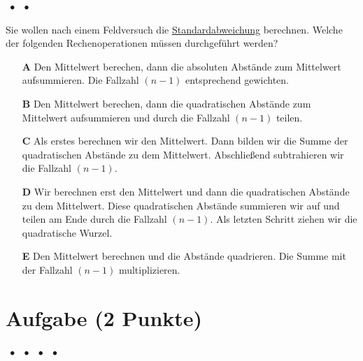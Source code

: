 \documentclass[a4paper, 9pt]{scrartcl}\usepackage[]{graphicx}\usepackage[]{xcolor}
\begin{document}
\ifcollection
\begin{flushright}
\tiny\vspace{-2Ex}
\textbf{\examinhaltstart}
\exammodulemathstat $\;\bullet$
\exammodulestat $\;\bullet$
\exammodulestatbbv 
\vspace{-1Ex}
\end{flushright}
\fi




Sie wollen nach einem Feldversuch die \uline{Standardabweichung} berechnen. Welche der folgenden Rechenoperationen müssen durchgeführt werden?



\begin{enumerate}
\item [\textbf{A} \msquare] Den Mittelwert berechen, dann die absoluten Abstände zum Mittelwert aufsummieren. Die Fallzahl $(n-1)$ entsprechend gewichten.
\item [\textbf{B} \msquare] Den Mittelwert berechen, dann die quadratischen Abstände zum Mittelwert aufsummieren und durch die Fallzahl $(n-1)$ teilen.
\item [\textbf{C} \msquare] Als erstes berechnen wir den Mittelwert. Dann bilden wir die Summe der quadratischen Abstände zu dem Mittelwert. Abschließend subtrahieren wir die Fallzahl $(n-1)$.
\item [\textbf{D} \msquare] Wir berechnen erst den Mittelwert und dann die quadratischen Abstände zu dem Mittelwert. Diese quadratischen Abstände summieren wir auf und teilen am Ende durch die Fallzahl $(n-1)$. Als letzten Schritt ziehen wir die quadratische Wurzel.
\item [\textbf{E} \msquare] Den Mittelwert berechnen und die Abstände quadrieren. Die Summe mit der Fallzahl $(n-1)$ multiplizieren.
\end{enumerate} 

\section{Aufgabe \hfill (2 Punkte)}

\ifcollection
\begin{flushright}
\tiny\vspace{-2Ex}
\textbf{\examinhaltstart}
\exammodulemathstat $\;\bullet$
\exammodulestat $\;\bullet$
\exammodulestatbbv $\;\bullet$
\exammodulestatversuch $\;\bullet$
\exammodulebiostat
\vspace{-1Ex}
\end{flushright}
\fi
\end{document}
